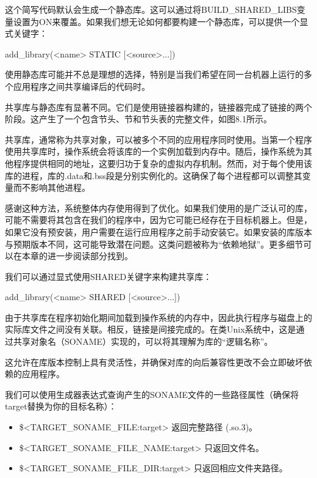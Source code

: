 这个简写代码默认会生成一个静态库。这可以通过将BUILD\_SHARED\_LIBS变量设置为ON来覆盖。如果我们想无论如何都要构建一个静态库，可以提供一个显式关键字：

\begin{shell}
add_library(<name> STATIC [<source>...])
\end{shell}

使用静态库可能并不总是理想的选择，特别是当我们希望在同一台机器上运行的多个应用程序之间共享编译后的代码时。


共享库与静态库有显著不同。它们是使用链接器构建的，链接器完成了链接的两个阶段。这产生了一个包含节头、节和节头表的完整文件，如图8.1所示。

共享库，通常称为共享对象，可以被多个不同的应用程序同时使用。当第一个程序使用共享库时，操作系统会将该库的一个实例加载到内存中。随后，操作系统为其他程序提供相同的地址，这要归功于复杂的虚拟内存机制。然而，对于每个使用该库的进程，库的.data和.bss段是分别实例化的。这确保了每个进程都可以调整其变量而不影响其他进程。

感谢这种方法，系统整体内存使用得到了优化。如果我们使用的是广泛认可的库，可能不需要将其包含在我们的程序中，因为它可能已经存在于目标机器上。但是，如果它没有预安装，用户需要在运行应用程序之前手动安装它。如果安装的库版本与预期版本不同，这可能导致潜在问题。这类问题被称为“依赖地狱”。更多细节可以在本章的进一步阅读部分找到。

我们可以通过显式使用SHARED关键字来构建共享库：

\begin{shell}
add_library(<name> SHARED [<source>...])
\end{shell}

由于共享库在程序初始化期间加载到操作系统的内存中，因此执行程序与磁盘上的实际库文件之间没有关联。相反，链接是间接完成的。在类Unix系统中，这是通过共享对象名（SONAME）实现的，可以将其理解为库的“逻辑名称”。

这允许在库版本控制上具有灵活性，并确保对库的向后兼容性更改不会立即破坏依赖的应用程序。

我们可以使用生成器表达式查询产生的SONAME文件的一些路径属性（确保将target替换为你的目标名称）：

\begin{itemize}
\item
\$<TARGET\_SONAME\_FILE:target> 返回完整路径 (.so.3)。

\item
\$<TARGET\_SONAME\_FILE\_NAME:target> 只返回文件名。

\item
\$<TARGET\_SONAME\_FILE\_DIR:target> 只返回相应文件夹路径。
\end{itemize}

